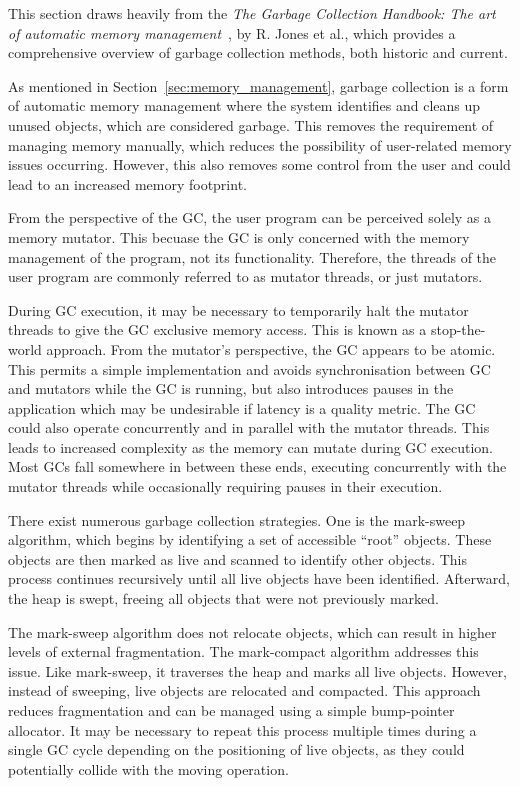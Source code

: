 This section draws heavily from the \textit{The Garbage Collection Handbook: The art of automatic memory management}~\cite{gchandbook}, by R. Jones et al., which provides a comprehensive overview of garbage collection methods, both historic and current.

As mentioned in Section~\ref{sec:memory_management}, garbage collection is a form of automatic memory management where the system identifies and cleans up unused objects, which are considered garbage. This removes the requirement of managing memory manually, which reduces the possibility of user-related memory issues occurring. However, this also removes some control from the user and could lead to an increased memory footprint.

From the perspective of the GC, the user program can be perceived solely as a memory mutator. This becuase the GC is only concerned with the memory management of the program, not its functionality. Therefore, the threads of the user program are commonly referred to as mutator threads, or just mutators.

During GC execution, it may be necessary to temporarily halt the mutator threads to give the GC exclusive memory access. This is known as a stop-the-world approach. From the mutator's perspective, the GC appears to be atomic. This permits a simple implementation and avoids synchronisation between GC and mutators while the GC is running, but also introduces pauses in the application which may be undesirable if latency is a quality metric. The GC could also operate concurrently and in parallel with the mutator threads. This leads to increased complexity as the memory can mutate during GC execution. Most GCs fall somewhere in between these ends, executing concurrently with the mutator threads while occasionally requiring pauses in their execution.

There exist numerous garbage collection strategies. One is the mark-sweep algorithm, which begins by identifying a set of accessible ``root'' objects. These objects are then marked as live and scanned to identify other objects. This process continues recursively until all live objects have been identified. Afterward, the heap is swept, freeing all objects that were not previously marked.

The mark-sweep algorithm does not relocate objects, which can result in higher levels of external fragmentation. The mark-compact algorithm addresses this issue. Like mark-sweep, it traverses the heap and marks all live objects. However, instead of sweeping, live objects are relocated and compacted. This approach reduces fragmentation and can be managed using a simple bump-pointer allocator. It may be necessary to repeat this process multiple times during a single GC cycle depending on the positioning of live objects, as they could potentially collide with the moving operation.

